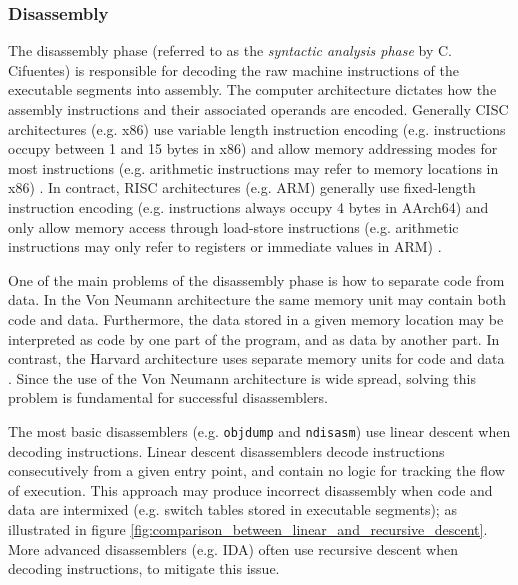 
\subsubsection{Disassembly}
\label{sec:lit_review_disassembly}


The disassembly phase (referred to as the \textit{syntactic analysis phase} by C. Cifuentes) is responsible for decoding the raw machine instructions of the executable segments into assembly. The computer architecture dictates how the assembly instructions and their associated operands are encoded. Generally CISC architectures (e.g. x86) use variable length instruction encoding (e.g. instructions occupy between 1 and 15 bytes in x86) and allow memory addressing modes for most instructions (e.g. arithmetic instructions may refer to memory locations in x86) \cite{x86_manual}. In contract, RISC architectures (e.g. ARM) generally use fixed-length instruction encoding (e.g. instructions always occupy 4 bytes in AArch64) and only allow memory access through load-store instructions (e.g. arithmetic instructions may only refer to registers or immediate values in ARM) \cite{arm_manual}.

One of the main problems of the disassembly phase is how to separate code from data. In the Von Neumann architecture the same memory unit may contain both code and data. Furthermore, the data stored in a given memory location may be interpreted as code by one part of the program, and as data by another part. In contrast, the Harvard architecture uses separate memory units for code and data \cite{von_neumann_vs_harvard}. Since the use of the Von Neumann architecture is wide spread, solving this problem is fundamental for successful disassemblers.

The most basic disassemblers (e.g. \texttt{objdump} and \texttt{ndisasm}) use linear descent when decoding instructions. Linear descent disassemblers decode instructions consecutively from a given entry point, and contain no logic for tracking the flow of execution. This approach may produce incorrect disassembly when code and data are intermixed (e.g. switch tables stored in executable segments); as illustrated in figure \ref{fig:comparison_between_linear_and_recursive_descent}. More advanced disassemblers (e.g. IDA) often use recursive descent when decoding instructions, to mitigate this issue.

